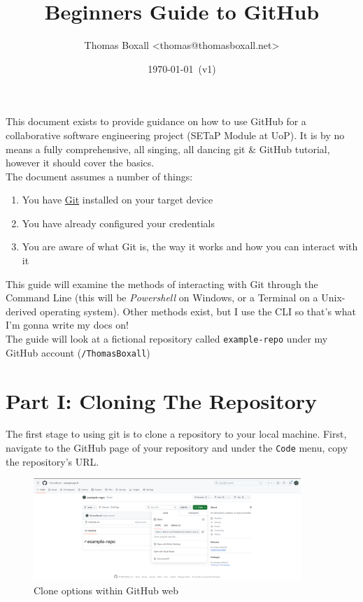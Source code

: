 \documentclass[a4paper, 11pt]{article}
\title{Beginners Guide to GitHub}
\date{\today\ (v1)}
\author{Thomas Boxall <thomas@thomasboxall.net>}
\begin{document}
\maketitle
This document exists to provide guidance on how to use GitHub for a collaborative software engineering project (SETaP Module at UoP). It is by no means a fully comprehensive, all singing, all dancing git \& GitHub tutorial, however it should cover the basics.\\

The document assumes a number of things:
\begin{enumerate}
    \item You have \href{https://git-scm.com/downloads}{Git} installed on your target device
    \item You have already configured your credentials
    \item You are aware of what Git is, the way it works and how you can interact with it
\end{enumerate}

This guide will examine the methods of interacting with Git through the Command Line (this will be \textit{Powershell} on Windows, or a Terminal on a Unix-derived operating system). Other methods exist, but I use the CLI so that's what I'm gonna write my docs on!\\

The guide will look at a fictional repository called \verb|example-repo| under my GitHub account (\verb|/ThomasBoxall|)

\section{Part I: Cloning The Repository}
The first stage to using git is to clone a repository to your local machine. First, navigate to the GitHub page of your repository and under the \verb|Code| menu, copy the repository's URL.
\begin{figure}[H]
    \centering
    \includegraphics[width=0.9\textwidth]{assets/gitclone.png}
    \caption{Clone options within GitHub web}
\end{figure}
\end{document}
